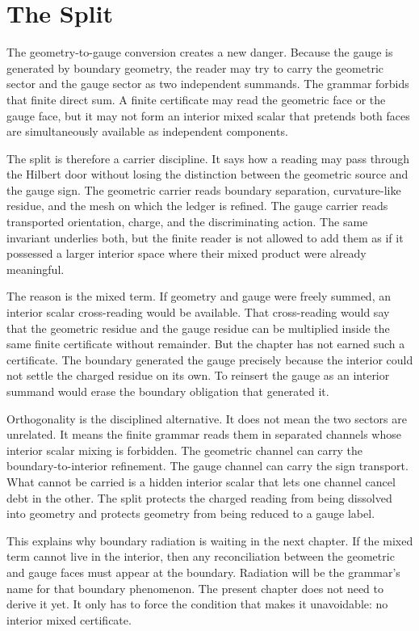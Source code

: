 \section{The Split}

The geometry-to-gauge conversion creates a new danger. Because the gauge is
generated by boundary geometry, the reader may try to carry the geometric
sector and the gauge sector as two independent summands. The grammar forbids
that finite direct sum. A finite certificate may read the geometric face or
the gauge face, but it may not form an interior mixed scalar that pretends
both faces are simultaneously available as independent components.

The split is therefore a carrier discipline. It says how a reading may pass
through the Hilbert door without losing the distinction between the
geometric source and the gauge sign. The geometric carrier reads boundary
separation, curvature-like residue, and the mesh on which the ledger is
refined. The gauge carrier reads transported orientation, charge, and the
discriminating action. The same invariant underlies both, but the finite
reader is not allowed to add them as if it possessed a larger interior space
where their mixed product were already meaningful.

The reason is the mixed term. If geometry and gauge were freely summed, an
interior scalar cross-reading would be available. That cross-reading would
say that the geometric residue and the gauge residue can be multiplied
inside the same finite certificate without remainder. But the chapter has
not earned such a certificate. The boundary generated the gauge precisely
because the interior could not settle the charged residue on its own. To
reinsert the gauge as an interior summand would erase the boundary
obligation that generated it.

Orthogonality is the disciplined alternative. It does not mean the two
sectors are unrelated. It means the finite grammar reads them in separated
channels whose interior scalar mixing is forbidden. The geometric channel
can carry the boundary-to-interior refinement. The gauge channel can carry
the sign transport. What cannot be carried is a hidden interior scalar that
lets one channel cancel debt in the other. The split protects the charged
reading from being dissolved into geometry and protects geometry from being
reduced to a gauge label.

This explains why boundary radiation is waiting in the next chapter. If the
mixed term cannot live in the interior, then any reconciliation between the
geometric and gauge faces must appear at the boundary. Radiation will be the
grammar's name for that boundary phenomenon. The present chapter does not
need to derive it yet. It only has to force the condition that makes it
unavoidable: no interior mixed certificate.

